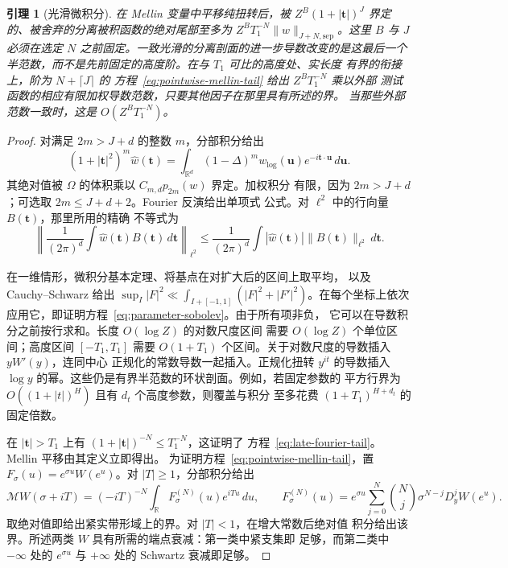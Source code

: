 \documentclass[11pt,a4paper]{article}
\numberwithin{equation}{section}
\numberwithin{figure}{section}
\newtheorem{lemma}[theorem]{引理}
\theoremstyle{definition}
\theoremstyle{remark}
\begin{document}
\begin{lemma}[光滑微积分]
在 Mellin 变量中平移纯扭转后，被 $Z^B(1+|\boldsymbol t|)^J$ 界定
的、被舍弃的分离被积函数的绝对尾部至多为
$Z^BT_1^{-N}\|w\|_{J+N,\mathrm{sep}}$。这里 $B$ 与 $J$ 必须在选定
$N$ 之前固定。一致光滑的分离剖面的进一步导数改变的是这最后一个
半范数，而不是先前固定的高度阶。在与 $T_1$ 可比的高度处、实长度
有界的衔接上，阶为 $N+\lceil J\rceil$ 的
方程~\eqref{eq:pointwise-mellin-tail} 给出 $Z^BT_1^{-N}$ 乘以外部
测试函数的相应有限加权导数范数，只要其他因子在那里具有所述的界。
当那些外部范数一致时，这是 $O(Z^BT_1^{-N})$。
\end{lemma}

\begin{proof}
对满足 $2m>J+d$ 的整数 $m$，分部积分给出
\[
 (1+|\boldsymbol t|^2)^m\widehat w(\boldsymbol t)
 =\int_{\mathbb R^d}(1-\Delta)^m w_{\log}(\boldsymbol u)
                       e^{-i\boldsymbol t\cdot\boldsymbol u}\,d\boldsymbol u.
\]
其绝对值被 $\Omega$ 的体积乘以 $C_{m,d}p_{2m}(w)$ 界定。加权积分
有限，因为 $2m>J+d$；可选取 $2m\le J+d+2$。Fourier 反演给出单项式
公式。对 $\ell^2$ 中的行向量 $B(\boldsymbol t)$，那里所用的精确
不等式为
\[
 \left\|\frac1{(2\pi)^d}\int\widehat w(\boldsymbol t)
                 B(\boldsymbol t)\,d\boldsymbol t\right\|_{\ell^2}
 \le\frac1{(2\pi)^d}\int|\widehat w(\boldsymbol t)|
                 \|B(\boldsymbol t)\|_{\ell^2}\,d\boldsymbol t.
\]

在一维情形，微积分基本定理、将基点在对扩大后的区间上取平均，
以及 Cauchy--Schwarz 给出
$\sup_I|F|^2\ll\int_{I+[-1,1]}(|F|^2+|F'|^2)$。在每个坐标上依次
应用它，即证明方程~\eqref{eq:parameter-sobolev}。由于所有项非负，
它可以在导数积分之前按行求和。长度 $O(\log Z)$ 的对数尺度区间
需要 $O(\log Z)$ 个单位区间；高度区间 $[-T_1,T_1]$ 需要
$O(1+T_1)$ 个区间。关于对数尺度的导数插入 $yW'(y)$，连同中心
正规化的常数导数一起插入。正规化扭转 $y^{it}$ 的导数插入
$\log y$ 的幂。这些仍是有界半范数的环状剖面。例如，若固定参数的
平方行界为 $O((1+|t|)^H)$ 且有 $d_t$ 个高度参数，则覆盖与积分
至多花费 $(1+T_1)^{H+d_t}$ 的固定倍数。

在 $|\boldsymbol t|>T_1$ 上有
$(1+|\boldsymbol t|)^{-N}\le T_1^{-N}$，这证明了
方程~\eqref{eq:late-fourier-tail}。Mellin 平移由其定义立即得出。
为证明方程~\eqref{eq:pointwise-mellin-tail}，置
$F_\sigma(u)=e^{\sigma u}W(e^u)$。对 $|T|\ge1$，分部积分给出
\[
 \mathcal MW(\sigma+iT)=(-iT)^{-N}
              \int_{\mathbb R}F_\sigma^{(N)}(u)e^{iTu}\,du,
 \qquad
 F_\sigma^{(N)}(u)=e^{\sigma u}\sum_{j=0}^N
       \binom Nj\sigma^{N-j}D_y^jW(e^u).
\]
取绝对值即给出紧实带形域上的界。对 $|T|<1$，在增大常数后绝对值
积分给出该界。所述两类 $W$ 具有所需的端点衰减：第一类中紧支集即
足够，而第二类中 $-\infty$ 处的 $e^{\sigma u}$ 与 $+\infty$ 处的
Schwartz 衰减即足够。


\end{proof}
\end{document}

